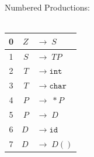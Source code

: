 \documentclass[fleqn]{article}
\begin{document}
\begin{enumerate}
  Numbered Productions:\\\\
  \begin{tabular}{| c | r   l |}
  \hline
  0 & $Z$ & $\rightarrow \; S$             \\
  \hline
  1 & $S$ & $\rightarrow \; T P$           \\
  \hline
  2 & $T$ & $\rightarrow \; \texttt{int}$  \\
  \hline
  3 & $T$ & $\rightarrow \; \texttt{char}$ \\
  \hline
  4 & $P$ & $\rightarrow \; * P$           \\
  \hline
  5 & $P$ & $\rightarrow \; D$             \\
  \hline
  6 & $D$ & $\rightarrow \; \texttt{id}$   \\
  \hline
  7 & $D$ & $\rightarrow \; D()$           \\
  \hline
  \end{tabular}\\\\


\end{enumerate}
\end{document}
